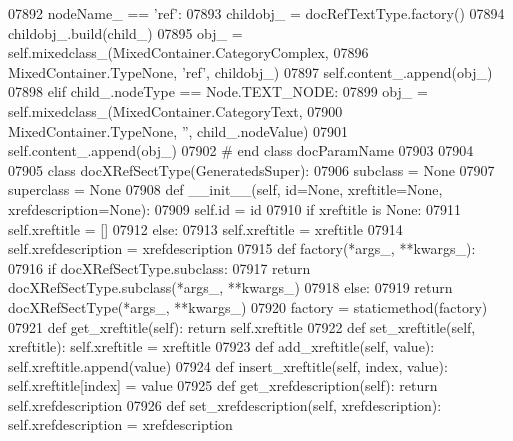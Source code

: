 \begin{DoxyCode}
{{{{{{{{{{{{{{{{{{{{{{{{{{{{{{{{{{{{{{{{{{{{{{{{{{{{{{{{{{{{{{{{{{{{{{{{{{{{{{{{{{{{{{{{{{{{{{{{{{{{{{{{{{{{{{{{{{{{{{{{{{{{{{{{{{{{{{{{{{{{{{{{{{{{{{{{{{{{{{{{{{{{{{{{{{{{{{{{{{{{{{{{{{{{{{{{{{{{{{{{{{{{{{{{{{{{{{{{{{{{{{{{{{{{{{{{{{{{{{{{{{{{{{{{{{{{{{{{{{{{{{{{{{{{{{{{{{{{{{{{{{{{{{{{{{{{{{{{{{{{{{{{{{{{{{{{{{{{{{{{{{{{{{{{{{{{{{{{{{{{{{{{{{{{{{{{{{{{{{{{{{{{{{{{{{{{{{{{{{{{{{{{{{{{{{{{{{{{{{{{{{{{{{{{{{{{{{{{{{{{{{{{{{{{{{{{{{{{{{{{{{{{{{{{{{{{{{{{{{{{{{{{{{{{{{{{{{{{{{{{{{{{{{07892             nodeName\_ == \textcolor{stringliteral}{'ref'}:
07893             childobj\_ = docRefTextType.factory()
07894             childobj\_.build(child\_)
07895             obj\_ = self.mixedclass_(MixedContainer.CategoryComplex,
07896                 MixedContainer.TypeNone, \textcolor{stringliteral}{'ref'}, childobj\_)
07897             self.content\_.append(obj\_)
07898         \textcolor{keywordflow}{elif} child\_.nodeType == Node.TEXT\_NODE:
07899             obj\_ = self.mixedclass_(MixedContainer.CategoryText,
07900                 MixedContainer.TypeNone, \textcolor{stringliteral}{''}, child\_.nodeValue)
07901             self.content\_.append(obj\_)
07902 \textcolor{comment}{# end class docParamName}
07903 
07904 
07905 \textcolor{keyword}{class }docXRefSectType(GeneratedsSuper):
07906     subclass = \textcolor{keywordtype}{None}
07907     superclass = \textcolor{keywordtype}{None}
07908     \textcolor{keyword}{def }__init__(self, id=None, xreftitle=None, xrefdescription=None):
07909         self.id = id
07910         \textcolor{keywordflow}{if} xreftitle \textcolor{keywordflow}{is} \textcolor{keywordtype}{None}:
07911             self.xreftitle = []
07912         \textcolor{keywordflow}{else}:
07913             self.xreftitle = xreftitle
07914         self.xrefdescription = xrefdescription
07915     \textcolor{keyword}{def }factory(*args\_, **kwargs\_):
07916         \textcolor{keywordflow}{if} docXRefSectType.subclass:
07917             \textcolor{keywordflow}{return} docXRefSectType.subclass(*args\_, **kwargs\_)
07918         \textcolor{keywordflow}{else}:
07919             \textcolor{keywordflow}{return} docXRefSectType(*args\_, **kwargs\_)
07920     factory = staticmethod(factory)
07921     \textcolor{keyword}{def }get_xreftitle(self): \textcolor{keywordflow}{return} self.xreftitle
07922     \textcolor{keyword}{def }set_xreftitle(self, xreftitle): self.xreftitle = xreftitle
07923     \textcolor{keyword}{def }add_xreftitle(self, value): self.xreftitle.append(value)
07924     \textcolor{keyword}{def }insert_xreftitle(self, index, value): self.xreftitle[index] = value
07925     \textcolor{keyword}{def }get_xrefdescription(self): \textcolor{keywordflow}{return} self.xrefdescription
07926     \textcolor{keyword}{def }set_xrefdescription(self, xrefdescription): self.xrefdescription = xrefdescription
}}}}}}}}}}}}}}}}}}}}}}}}}}}}}}}}}}}}}}}}}}}}}}}}}}}}}}}}}}}}}}}}}}}}}}}}}}}}}}}}}}}}}}}}}}}}}}}}}}}}}}}}}}}}}}}}}}}}}}}}}}}}}}}}}}}}}}}}}}}}}}}}}}}}}}}}}}}}}}}}}}}}}}}}}}}}}}}}}}}}}}}}}}}}}}}}}}}}}}}}}}}}}}}}}}}}}}}}}}}}}}}}}}}}}}}}}}}}}}}}}}}}}}}}}}}}}}}}}}}}}}}}}}}}}}}}}}}}}}}}}}}}}}}}}}}}}}}}}}}}}}}}}}}}}}}}}}}}}}}}}}}}}}}}}}}}}}}}}}}}}}}}}}}}}}}}}}}}}}}}}}}}}}}}}}}}}}}}}}}}}}}}}}}}}}}}}}}}}}}}}}}}}}}}}}}}}}}}}}}}}}}}}}}}}}}}}}}}}}}}}}}}}}}}}}}}}}}}}}}}}}}}}}}}}}}}}}}}}}}}}}}}}}
\end{DoxyCode}
